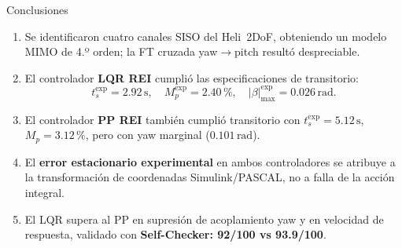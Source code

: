 \documentclass[mathserif,spanish,10pt]{beamer}
\begin{document}
\begin{frame}{Conclusiones}
  \begin{enumerate}
    \item Se identificaron cuatro canales SISO del Heli~2DoF, obteniendo un modelo MIMO de 4.º orden; la FT cruzada yaw$\to$pitch resultó despreciable.

    \item El controlador \textbf{LQR REI} cumplió las especificaciones de transitorio:
          \[
            t_s^{\text{exp}}=2.92\,\text{s},\quad
            M_p^{\text{exp}}=2.40\,\%,\quad
            |\beta|_{\max}^{\text{exp}}=0.026\,\text{rad}.
          \]

    \item El controlador \textbf{PP REI} también cumplió transitorio con $t_s^{\text{exp}}=5.12\,\text{s}$, $M_p=3.12\,\%$, pero con yaw marginal ($0.101\,\text{rad}$).

    \item El \textbf{error estacionario experimental} en ambos controladores se atribuye a la transformación de coordenadas Simulink/PASCAL, no a falla de la acción integral.

    \item El LQR supera al PP en supresión de acoplamiento yaw y en velocidad de respuesta, validado con \textbf{Self-Checker: 92/100 vs 93.9/100}.
  \end{enumerate}
\end{frame}
\end{document}
